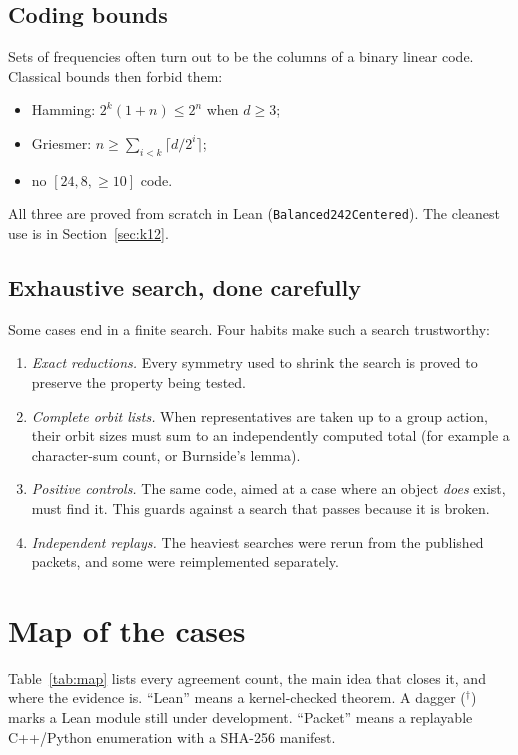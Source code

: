 \documentclass[11pt]{article}
\theoremstyle{definition}
\theoremstyle{remark}
\newcommand{\code}[1]{\texttt{#1}}
\DeclareRobustCommand{\_}{\textunderscore\allowbreak}
\begin{document}
\subsection{Coding bounds}
Sets of frequencies often turn out to be the columns of a binary linear code. Classical bounds then forbid them:
\begin{itemize}[nosep]
  \item Hamming: $2^k(1+n)\le2^n$ when $d\ge3$;
  \item Griesmer: $n\ge\sum_{i<k}\lceil d/2^i\rceil$;
  \item no $[24,8,\ge10]$ code.
\end{itemize}
All three are proved from scratch in Lean (\code{Balanced242Centered}). The cleanest use is in Section~\ref{sec:k12}.

\subsection{Exhaustive search, done carefully}
Some cases end in a finite search. Four habits make such a search trustworthy:
\begin{enumerate}[nosep]
  \item \emph{Exact reductions.} Every symmetry used to shrink the search is proved to preserve the property being tested.
  \item \emph{Complete orbit lists.} When representatives are taken up to a group action, their orbit sizes must sum to an independently computed total (for example a character-sum count, or Burnside's lemma).
  \item \emph{Positive controls.} The same code, aimed at a case where an object \emph{does} exist, must find it. This guards against a search that passes because it is broken.
  \item \emph{Independent replays.} The heaviest searches were rerun from the published packets, and some were reimplemented separately.
\end{enumerate}

\section{Map of the cases}
\label{sec:map}

Table~\ref{tab:map} lists every agreement count, the main idea that closes it, and where the evidence is. ``Lean'' means a kernel-checked theorem. A dagger ($^\dagger$) marks a Lean module still under development. ``Packet'' means a replayable C++/Python enumeration with a SHA-256 manifest.
\end{document}
